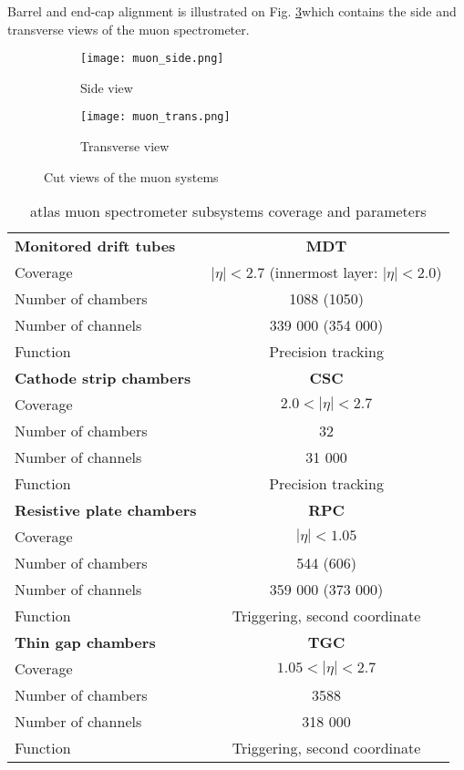 	 Barrel and end-cap alignment is illustrated on Fig. \ref{fig::muon_cut}which contains the side and transverse views of the muon spectrometer.
	\begin{figure}[htbp]
		\begin{subfigure}[t]{0.65\textwidth}
			\texttt{[image: muon\_side.png]}
			\caption[Side view]{Side view}
			\label{fig::side}
		\end{subfigure}
		\hfill
		\begin{subfigure}[t]{0.33\textwidth} 
			\texttt{[image: muon\_trans.png]}
			\caption[Transverse view]{Transverse view}
			\label{fig::transverse}
		\end{subfigure}
		\caption{Cut views of the muon systems}
		\label{fig::muon_cut}
	\end{figure}
	
	\begin{table}
	\centering
	\begin{tabular}{|l|c|}
		\hline	
		\textbf{Monitored drift tubes} & \textbf{MDT} \\
		Coverage & $|\eta| < 2.7$ (innermost layer: $|\eta| < 2.0$) \\
		Number of chambers  & 1088 (1050)\\
		Number of channels  & 339 000 (354 000)\\
		Function  & Precision tracking\\
		\hline	
		\textbf{Cathode strip chambers} & \textbf{CSC} \\
		Coverage & $2.0 < |\eta| < 2.7$  \\
		Number of chambers  & 32\\
		Number of channels  & 31 000\\
		Function  & Precision tracking\\
		\hline	
		\textbf{Resistive plate chambers} & \textbf{RPC} \\
		Coverage & $|\eta| < 1.05$  \\
		Number of chambers  & 544 (606)\\
		Number of channels  & 359 000 (373 000)\\
		Function  & Triggering, second coordinate\\
		\hline	
		\textbf{Thin gap chambers} & \textbf{TGC} \\
		Coverage & $1.05 < |\eta| < 2.7$  \\
		Number of chambers  & 3588\\
		Number of channels  & 318 000\\
		Function  & Triggering, second coordinate\\
		\hline	
	\end{tabular}\\
	\caption{ \gls{atlas} muon spectrometer subsystems coverage and parameters}
	\label{tab::muon_table}
\end{table}

